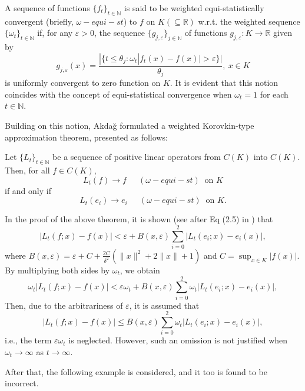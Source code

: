 \documentclass[reqno]{amsart}
\begin{document}
\begin{definition}\cite[Definition 2.2]{akdaug2017weighted}
	A sequence of functions $\{f_t\}_{t\in\mathbb{N}}$ is said to be weighted equi-statistically convergent (briefly, $\omega-equi-st$) to $f$  on $K(\subseteq \mathbb{R})$ w.r.t. the weighted sequence $\{\omega_t\}_{t\in\mathbb{N}}$ if, for any $\varepsilon>0$, the sequence $\{g_{j,\varepsilon}\}_{j\in\mathbb{N}}$ of functions $g_{j,\varepsilon}:K\to \mathbb{R}$ given by 
	\begin{equation*}
	g_{j,\varepsilon}(x)=\frac{|\{t\leq \theta_j:\omega_t|f_t(x)-f(x)|> \varepsilon\}|}{\theta_j},~x\in K
	\end{equation*}
	is uniformly convergent to zero function on $K$. It is evident that this notion coincides with the concept of equi-statistical convergence  when $\omega_t=1$ for each $t\in\mathbb{N}$.
\end{definition}
Building on this notion, Akdağ \cite{akdaug2017weighted} formulated a weighted Korovkin-type approximation theorem, presented as follows:
\begin{theorem}\cite[Theorem 2.2]{akdaug2017weighted}\label{thMm5.4}
	Let $\{L_t\}_{t\in\mathbb{N}}$ be a sequence of positive linear operators from $C(K)$ into $C(K)$. Then, for all $f \in C(K)$,
	\[
	L_t(f) \to f ~~\quad(\omega-equi-st ) ~\text{ on } K
	\]
	if and only if
	\begin{equation*}
		L_t(e_i) \to e_i ~~\quad(\omega-equi-st )~ \text{ on } K.
	\end{equation*}
	
\end{theorem}
\begin{note}
	In the proof of the above theorem, it is shown (see after Eq (2.5) in \cite[Theorem 2.2]{akdaug2017weighted}) that
	$$
	|L_t(f;x)-f(x)|<\varepsilon+B(x,\varepsilon)\sum_{i=0}^{2}|L_t(e_i;x)-e_i(x)|,
	$$
	where $B(x,\varepsilon)=\varepsilon + C + \frac{2C} {\delta^2 }(\|x\|^2 + 2\|x\| + 1)$ and $C=\displaystyle\sup_{x\in K}|f(x)|$. By multiplying both sides by $\omega_t$, we obtain 
	$$
	\omega_t|L_t(f;x)-f(x)|<\varepsilon\omega_t+B(x,\varepsilon)\sum_{i=0}^{2}\omega_t|L_t(e_i;x)-e_i(x)|,
	$$
	Then, due to the arbitrariness of $\varepsilon$, it is assumed that 
	$$
	|L_t(f;x)-f(x)|\leq B(x,\varepsilon)\sum_{i=0}^{2}\omega_t|L_t(e_i;x)-e_i(x)|,
	$$
	i.e., the term $\varepsilon\omega_t$ is neglected. However, such an omission is not justified when $\omega_t\to\infty$ as $t\to\infty$.
\end{note}
After that, the following example is considered, and it too is found to be incorrect. 
\end{document}
